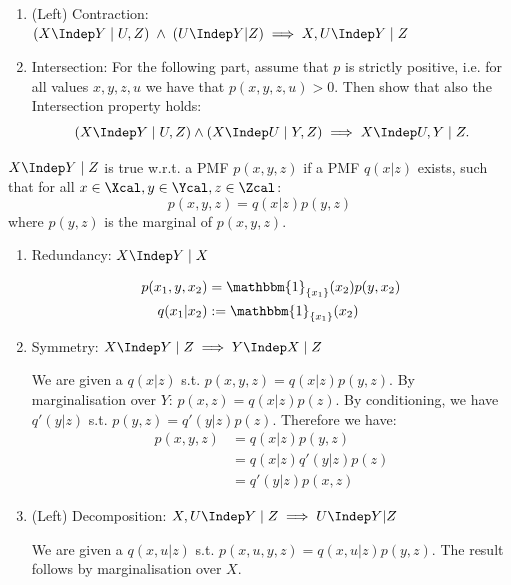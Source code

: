 \begin{enumerate}[label=4.\arabic*]
\begin{enumerate}
        \item (Left) Contraction: $(X \Indep Y\; |\; U, Z) \; \land \; (U \Indep Y | Z) \implies X, U \Indep Y \; | \; Z$ \\

        \item Intersection: For the following part, assume that $p$ is strictly positive, i.e. for all values $x,y,z,u$ we have that $p(x, y, z, u) > 0$. Then show that also the Intersection property holds:
        $$(X \Indep Y \;|\;U,Z) \land (X \Indep U \; | \; Y,Z)  \implies  X \Indep U,Y \; | \; Z.$$
    \end{enumerate}

    \begin{ungradedsolution}
        $X \Indep Y \; | \; Z$ is true w.r.t. a PMF $p(x, y, z)$ if a PMF $q(x|z)$ exists, such that for all $x \in \Xcal, y \in \Ycal, z \in \Zcal$:
        \[
            p(x,y,z)=q(x|z)p(y,z)
        \]
        where $p(y,z)$ is the marginal of $p(x,y,z)$.
        \begin{enumerate}
            \item Redundancy: $X \Indep Y \;|\; X$

            \begin{align*}
                p(x_1,y,x_2) & =\mathbbm{1}_{\{x_1\}}(x_2)p(y, x_2) \\
                q(x_1|x_2)   & :=\mathbbm{1}_{\{x_1\}}(x_2)
            \end{align*}

            \item Symmetry: $X \Indep Y\; |\; Z \implies Y \Indep X\; |\; Z$

            We are given a $q(x|z)$ s.t. $p(x,y,z)=q(x|z)p(y,z)$. By marginalisation over $Y$: $p(x, z)=q(x|z)p(z)$. By conditioning, we have $q'(y|z)$ s.t. $p(y,z)=q'(y|z)p(z)$. Therefore we have:
            \begin{align*}
                p(x,y,z)
                 & =q(x|z)p(y,z)      \\
                 & =q(x|z)q'(y|z)p(z) \\
                 & =q'(y|z)p(x,z)
            \end{align*}

            \item (Left) Decomposition: $X, U \Indep Y \; | \; Z \implies U \Indep Y | Z\; $

            We are given a $q(x,u|z)$ s.t. $p(x, u, y, z)=q(x, u|z)p(y, z)$.
            The result follows by marginalisation over $X$.


\end{enumerate}
\end{ungradedsolution}
\end{enumerate}
